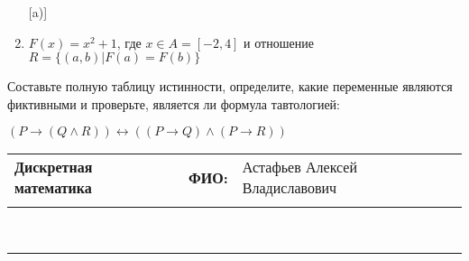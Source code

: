 \documentclass[10pt]{exam}
\newcommand{\class}{Дискретная математика}
\newcommand{\examdate}{}
\begin{document}
\begin{questions}
\begin{enumerate} [a)]
\item $F(x)=x^{2}+1$, где $x \in A = [-2, 4]$ и отношение $R = \{(a,b)|F(a) = F(b)\}$
\end{enumerate}\question Составьте полную таблицу истинности, определите, какие переменные являются фиктивными и проверьте, является ли формула тавтологией:

$(P \rightarrow (Q \land R)) \leftrightarrow ((P \rightarrow Q) \land (P \rightarrow R))$

\end{questions}
\newpage
\begin{flushright}
\begin{tabular}{p{2.8in} r l}
\textbf{\class} & \textbf{ФИО:} &Астафьев Алексей Владиславович
\\

\textbf{\examdate} &&\\
\end{tabular}\\
\end{flushright}
\rule[1ex]{\textwidth}{.1pt}
\end{document}
